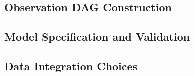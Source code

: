 \documentclass{article}
\begin{document}
\subsection{Observation DAG Construction}

\subsection{Model Specification and Validation}\label{sec:spec-validate}

\subsection{Data Integration Choices}

\end{document}
